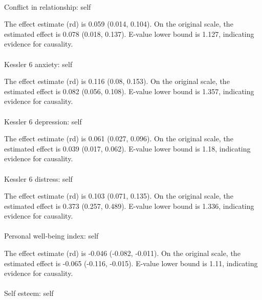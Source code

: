\documentclass[
  single column]{article}
\makeatletter
\let\oldparagraph\paragraph
\renewcommand{\paragraph}{
    \@ifstar
      \xxxParagraphStar
      \xxxParagraphNoStar
  }
\newcommand{\xxxParagraphStar}[1]{\oldparagraph*{#1}\mbox{}}
\newcommand{\xxxParagraphNoStar}[1]{\oldparagraph{#1}\mbox{}}
\makeatother
\begin{document}
\paragraph{Conflict in relationship:
self}\label{conflict-in-relationship-self}

The effect estimate (rd) is 0.059 (0.014, 0.104). On the original scale,
the estimated effect is 0.078 (0.018, 0.137). E-value lower bound is
1.127, indicating evidence for causality.

\paragraph{Kessler 6 anxiety: self}\label{kessler-6-anxiety-self}

The effect estimate (rd) is 0.116 (0.08, 0.153). On the original scale,
the estimated effect is 0.082 (0.056, 0.108). E-value lower bound is
1.357, indicating evidence for causality.

\paragraph{Kessler 6 depression: self}\label{kessler-6-depression-self}

The effect estimate (rd) is 0.061 (0.027, 0.096). On the original scale,
the estimated effect is 0.039 (0.017, 0.062). E-value lower bound is
1.18, indicating evidence for causality.

\paragraph{Kessler 6 distress: self}\label{kessler-6-distress-self}

The effect estimate (rd) is 0.103 (0.071, 0.135). On the original scale,
the estimated effect is 0.373 (0.257, 0.489). E-value lower bound is
1.336, indicating evidence for causality.

\paragraph{Personal well-being index:
self}\label{personal-well-being-index-self-1}

The effect estimate (rd) is -0.046 (-0.082, -0.011). On the original
scale, the estimated effect is -0.065 (-0.116, -0.015). E-value lower
bound is 1.11, indicating evidence for causality.

\paragraph{Self esteem: self}\label{self-esteem-self}
\end{document}
